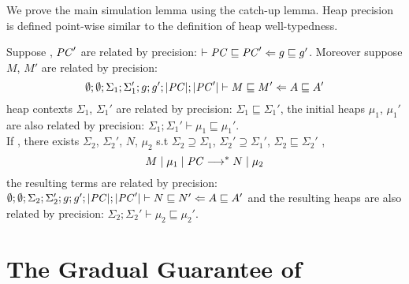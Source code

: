 We prove the main simulation lemma using the catch-up lemma. Heap precision is
defined point-wise similar to the definition of heap well-typedness.

\begin{lemma}
\label{lem:sim}
Suppose \PC, $\mathit{PC}'$ are related by precision: $\ccprec{\PC}{\PC'}{g}{g'}$.
Moreover suppose $M$, $M'$ are related by precision:
$${\emptyset};{\emptyset};{\Sigma_1};{\Sigma_1'};{g};{g'};{|\mathit{PC}|};{|\mathit{PC}'|}\vdash{M}\sqsubseteq{M'}\Leftarrow{A}\sqsubseteq{A'}$$
heap contexts $\Sigma_1$, $\Sigma_1'$ are related by precision:
$\Sigma_1 \sqsubseteq \Sigma_1'$, the initial heaps $\mu_1$, $\mu_1'$
are also related by precision: $\Sigma_1 ; \Sigma_1' \vdash \mu_1 \sqsubseteq \mu_1'$. \\
If , there exists $\Sigma_2$,
$\Sigma_2'$, $N$, $\mu_2$ s.t $\Sigma_2 \supseteq \Sigma_1$,
$\Sigma_2' \supseteq \Sigma_1'$, $\Sigma_2 \sqsubseteq \Sigma_2'$ ,
$$M\mid\mu_1\mid\mathit{PC} \longrightarrow^{*} N\mid\mu_2$$
the resulting terms are related by precision:
${\emptyset};{\emptyset};{\Sigma_2};{\Sigma_2'};{g};{g'};{|\mathit{PC}|};{|\mathit{PC}'|}\vdash{N}\sqsubseteq{N'}\Leftarrow{A}\sqsubseteq{A'}$
and the resulting heaps are also related by precision: $\Sigma_2 ; \Sigma_2' \vdash \mu_2 \sqsubseteq \mu_2'$.
\end{lemma}


\section{The Gradual Guarantee of \Surface}
\label{sec:gg}

